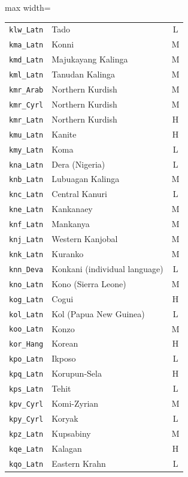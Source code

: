 {\begin{adjustbox}{max width=\textwidth}
\begin{tabular}{llc}
        \texttt{klw\_Latn} & Tado & L \\
        \texttt{kma\_Latn} & Konni & M \\
        \texttt{kmd\_Latn} & Majukayang Kalinga & M \\
        \texttt{kml\_Latn} & Tanudan Kalinga & M \\
        \texttt{kmr\_Arab} & Northern Kurdish & M \\
        \texttt{kmr\_Cyrl} & Northern Kurdish & M \\
        \texttt{kmr\_Latn} & Northern Kurdish & H \\
        \texttt{kmu\_Latn} & Kanite & H \\
        \texttt{kmy\_Latn} & Koma & L \\
        \texttt{kna\_Latn} & Dera (Nigeria) & L \\
        \texttt{knb\_Latn} & Lubuagan Kalinga & M \\
        \texttt{knc\_Latn} & Central Kanuri & L \\
        \texttt{kne\_Latn} & Kankanaey & M \\
        \texttt{knf\_Latn} & Mankanya & M \\
        \texttt{knj\_Latn} & Western Kanjobal & M \\
        \texttt{knk\_Latn} & Kuranko & M \\
        \texttt{knn\_Deva} & Konkani (individual language) & L \\
        \texttt{kno\_Latn} & Kono (Sierra Leone) & M \\
        \texttt{kog\_Latn} & Cogui & H \\
        \texttt{kol\_Latn} & Kol (Papua New Guinea) & L \\
        \texttt{koo\_Latn} & Konzo & M \\
        \texttt{kor\_Hang} & Korean & H \\
        \texttt{kpo\_Latn} & Ikposo & L \\
        \texttt{kpq\_Latn} & Korupun-Sela & H \\
        \texttt{kps\_Latn} & Tehit & L \\
        \texttt{kpv\_Cyrl} & Komi-Zyrian & M \\
        \texttt{kpy\_Cyrl} & Koryak & L \\
        \texttt{kpz\_Latn} & Kupsabiny & M \\
        \texttt{kqe\_Latn} & Kalagan & H \\
        \texttt{kqo\_Latn} & Eastern Krahn & L \\

\end{tabular}
\end{adjustbox}}

